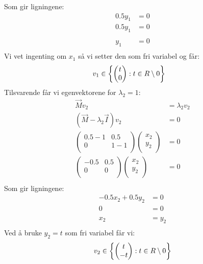 Som gir ligningene:
\begin{align*}
  0.5y_1 &= 0\\
  0.5y_1 &= 0\\
  \\
  y_1 &= 0\\
\end{align*}
Vi vet ingenting om $x_1$ så vi setter den som fri variabel og får:
\begin{align*}
  v_1 &\in \left\{ 
        \begin{pmatrix}
          t\\
          0\\
        \end{pmatrix}:
  t \in R \setminus 0 \right \}
\end{align*}
Tilsvarende får vi egenvektorene for $\lambda_2 = 1$:
\begin{align*}
  \vec{M}v_2 &= \lambda_2 v_2\\
  (\vec{M}-\lambda_2\vec{I})v_2 &= 0\\
  \begin{pmatrix}
    0.5-1 & 0.5 \\
    0 & 1-1 \\
  \end{pmatrix}
  \begin{pmatrix}
    x_2\\
    y_2\\
  \end{pmatrix}&=0\\
  \begin{pmatrix}
    -0.5 & 0.5 \\
    0 & 0 \\
  \end{pmatrix}
  \begin{pmatrix}
    x_2\\
    y_2\\
  \end{pmatrix}&=0\\
\end{align*}
Som gir ligningene:
\begin{align*}
  -0.5x_2 + 0.5y_2 &= 0\\
  0&= 0\\
  \\
  x_2 &= y_2\\
\end{align*}
Ved å bruke $y_2=t$ som fri variabel får vi:
\begin{align*}
  v_2 \in \left\{ 
  \begin{pmatrix}
    t \\
    -t \\
  \end{pmatrix}
  : t \in R \setminus 0 
   \right \}
\end{align*}

